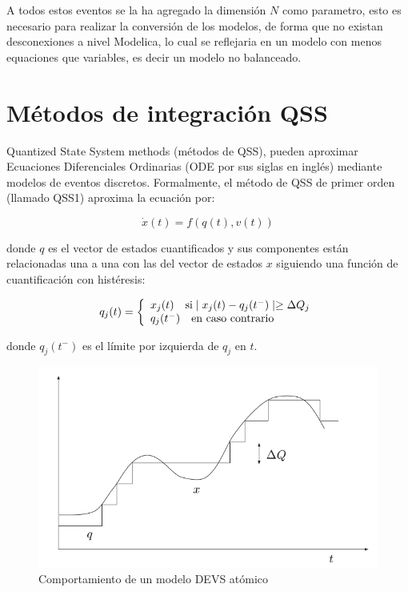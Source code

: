 \documentclass[a4paper,	11pt]{report}
\begin{document}
A todos estos eventos se la ha agregado la dimensión $N$ como parametro, esto es necesario para realizar la conversión de los modelos, de forma que no existan desconexiones a nivel Modelica, lo cual se reflejaria en un modelo con menos equaciones que variables, es decir un modelo no balanceado.
	 
\section{Métodos de integración QSS}
Quantized State System methods (métodos de QSS), pueden aproximar Ecuaciones Diferenciales Ordinarias (ODE por sus siglas en inglés) mediante modelos de eventos discretos. Formalmente, el método de QSS de primer orden (llamado QSS1) aproxima la ecuación por:

\begin{equation}
\dot{x}(t) = f (q(t), v(t))
\end{equation}

donde $q$ es el vector de estados cuantificados y sus componentes están relacionadas una a una con las del vector de estados $x$ siguiendo una función de cuantificación con histéresis:

\begin{equation}
q_j(t) = \left\{ 
  \begin{array}{l l}
    x_j(t)  \quad \text{si} \mid x_j (t ) - q_j (t^{-} ) \mid \geq \Delta Q_j \\
    q_j (t^{-} ) \quad \text{en caso contrario}
  \end{array} \right.
\end{equation}

donde $q_j (t^{-})$ es el límite por izquierda de $q_j$ en $t$.

\begin{figure}[!htbp]
  \includegraphics[scale=0.5]{histeresis1}
  \caption{Comportamiento de un modelo DEVS atómico}
   \label{fig:fig2-2}
\end{figure}
\end{document}
